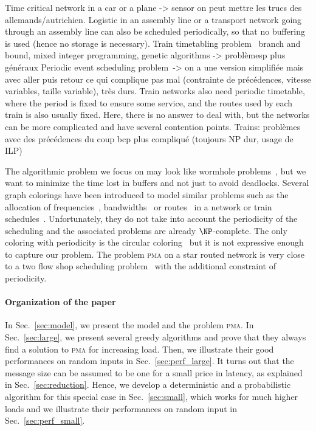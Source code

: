 \documentclass[10pt, conference, letterpaper]{IEEEtran}
\newcommand\pma{\textsc{pma}\xspace}
\begin{document}
Time critical network in a car or a plane -> sensor on peut mettre les trucs des allemands/autrichien.
Logistic in an assembly line or a transport network going through an assembly line can also be scheduled
periodically, so that no buffering is used (hence no storage is necessary). 
Train timetabling problem~\cite{lusby2011railway}  branch and bound, mixed integer programming, genetic algorithms -> problèmesp plus généraux
Periodic event scheduling problem~\cite{serafini1989mathematical}-> on a une version simplifiée mais avec aller puis retour ce qui complique pas mal (contrainte de précédences, vitesse variables, taille variable), très durs.
Train networks also need periodic timetable, where the period is fixed to ensure some service, and the routes 
used by each train is also usually fixed. Here, there is no answer to deal with, but the networks can be more complicated and
have several contention points. 
Trains: problèmes avec des précédences du coup bcp plus compliqué (toujours NP dur, usage de ILP)



The algorithmic problem we focus on may look like wormhole problems~\cite{cole1996benefit}, but we want to minimize the time lost in buffers and not just to avoid deadlocks. Several graph colorings have been introduced to model similar problems such as the allocation of frequencies~\cite{borndorfer1998frequency}, bandwidths~\cite{erlebach2001complexity} or routes~\cite{cole1996benefit} in a network or train schedules~\cite{strotmann2007railway}. Unfortunately, they do not take into account the periodicity of the scheduling and the associated problems are already $\NP$-complete. The only coloring with periodicity is the circular coloring~\cite{zhou2013multiple} but it is not expressive enough to capture our problem. 
The problem \pma on a star routed network is very close to a two flow shop scheduling problem~\cite{yu2004minimizing}
with the additional constraint of periodicity.



\paragraph{Organization of the paper}

In Sec.~\ref{sec:model}, we present the model and the problem \pma. In Sec.~\ref{sec:large},
we present several greedy algorithms and prove that they always find a solution to \pma for increasing load. Then, we illustrate their good performances on random inputs in Sec.~\ref{sec:perf_large}. It turns out that the message size can be assumed to be one for a small price in latency, as explained in Sec.~\ref{sec:reduction}. Hence, we develop a deterministic and a probabilistic algorithm for this special case in Sec.~\ref{sec:small}, which works for much higher loads and we illustrate their performances on random input in Sec.~\ref{sec:perf_small}.
\end{document}
